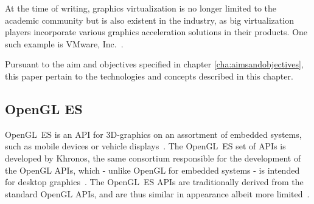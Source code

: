 At the time of writing, graphics virtualization is no longer limited to the academic community but is also existent in the industry, as big virtualization players incorporate various graphics acceleration solutions in their products.
One such example is VMware, Inc.~.

Pursuant to the aim and objectives specified in chapter \ref{cha:aimsandobjectives}, this paper pertain to the technologies and concepts described in this chapter.

\subsection{OpenGL ES}
\label{sec:backgroundandrelatedwork_opengles}
OpenGL~ES is an API for 3D-graphics on an assortment of embedded systems, such as mobile devices or vehicle displays~.
The OpenGL~ES set of APIs is developed by Khronos, the same consortium responsible for the development of the OpenGL APIs, which - unlike OpenGL for embedded systems - is intended for desktop graphics~.
The OpenGL~ES APIs are traditionally derived from the standard OpenGL APIs, and are thus similar in appearance albeit more limited~.



